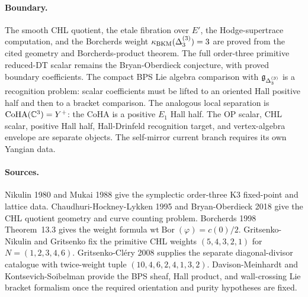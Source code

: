 \paragraph{Boundary.} The smooth CHL quotient, the etale fibration over
$E'$, the Hodge-supertrace computation, and the Borcherds weight
$\kappa_{\mathrm{BKM}}(\Delta_{3}^{(3)})=3$ are proved from the cited geometry and
Borcherds-product theorem. The full order-three primitive reduced-DT
scalar remains the Bryan-Oberdieck conjecture, with proved boundary
coefficients. The compact BPS Lie algebra comparison with
$\mathfrak{g}_{\Delta_3^{(3)}}$ is a recognition problem: scalar coefficients
must be lifted to an oriented Hall positive half and then to a bracket
comparison. The analogous local separation is
$\mathrm{CoHA}(\mathbb{C}^3)=Y^+$: the CoHA is a positive $E_1$ Hall half. The OP
scalar, CHL scalar, positive Hall half, Hall-Drinfeld recognition
target, and vertex-algebra envelope are separate objects. The
self-mirror current branch requires its own Yangian data.

\paragraph{Sources.} Nikulin 1980 and Mukai 1988 give the symplectic
order-three K3 fixed-point and lattice data. Chaudhuri-Hockney-Lykken
1995 and Bryan-Oberdieck 2018 give the CHL quotient geometry and curve
counting problem. Borcherds 1998 Theorem~13.3 gives the weight formula
$\mathrm{wt}\operatorname{Bor}(\varphi)=c(0)/2$. Gritsenko-Nikulin and
Gritsenko fix the primitive CHL weights
$(5,4,3,2,1)$ for $N=(1,2,3,4,6)$. Gritsenko-Cl\'ery 2008 supplies the
separate diagonal-divisor catalogue with twice-weight tuple
$(10,4,6,2,4,1,3,2)$. Davison-Meinhardt and Kontsevich-Soibelman
provide the BPS sheaf, Hall product, and wall-crossing Lie bracket
formalism once the required orientation and purity hypotheses are fixed.
